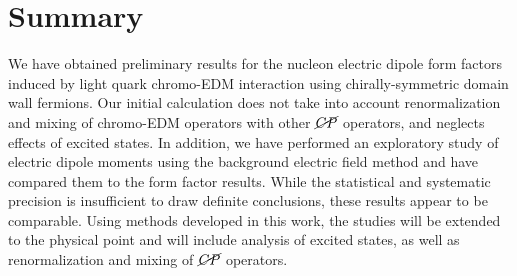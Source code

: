 \documentclass{PoS}
\newcommand{\alfive}{{\alpha_5}}
\newcommand{\CPviol}{{\cancel{CP}}}
\begin{document}
%

\section{Summary}
We have obtained preliminary results for the nucleon electric dipole form factors induced 
by light quark chromo-EDM interaction using chirally-symmetric domain wall fermions.
Our initial calculation does not take into account renormalization and mixing of chromo-EDM 
operators with other $\CPviol$ operators, and neglects effects of excited states. 
In addition, we have performed an exploratory study of electric dipole moments 
using the background electric field method and have compared them to the form factor results.
While the statistical and systematic precision is insufficient to draw definite conclusions,
these results appear to be comparable.
Using methods developed in this work, the studies will be extended to the physical point 
and will include analysis of excited states, as well as renormalization and mixing of 
$\CPviol$ operators.
\end{document}
